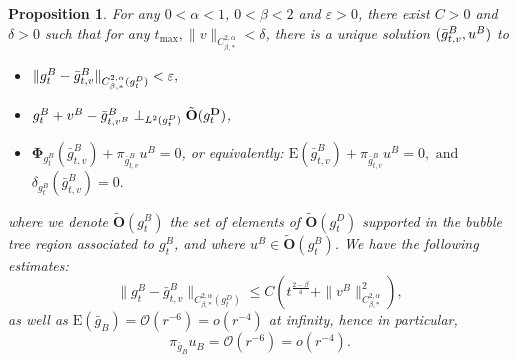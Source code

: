 \documentclass[11pt,reqno]{amsart}
\numberwithin{equation}{section}
\newcommand{\E}{\mathrm{E}}
\newcommand{\cO}{\mathcal{O}}
\newtheorem{proposition}[thm]{Proposition}
\theoremstyle{definition}
\theoremstyle{remark}
\begin{document}
\begin{proposition}\label{prop: gluing trees}
    For any $0<\alpha<1$, $0<\beta<2$ and $\varepsilon>0$, there exist $C>0$ and $\delta>0$ such that for any $t_{\max},\|v\|_{C^{2,\alpha}_{\beta,*}}<\delta$, there is a unique solution $(\Bar{g}^B_{t ,v },u^B )$ to 
\begin{itemize}
    \item $\|g^B_{t }-\Bar{g}^B_{t ,v }\|_{C^{2,\alpha}_{\beta,*}(g^D_{t })}<\varepsilon,$ 
    \item $g^B_{t }+v ^B-\Bar{g}^B_{t ,v ^B}\perp_{L^2(g^D_{t })} \tilde{\mathbf{O}}(g^\textbf{D}_{t })$,
    \item $\mathbf{\Phi}_{g^B_{t }}(\bar{g}^B_{t ,v }) + \pi_{\bar{g}^B_{t ,v }}u^B  = 0$, or equivalently: $\E(\bar{g}^B_{t ,v }) + \pi_{\bar{g}^B_{t ,v }}u^B  = 0,\text{ and}$
$\delta_{g^B_{t }}(\bar{g}^B_{t ,v }) = 0.$
\end{itemize}
where we denote $\tilde{\mathbf{O}}(g^B_{t })$ the set of elements of $\tilde{\mathbf{O}}(g^D_{t })$ supported in the bubble tree region associated to $g^B_{t }$, and where $u^B \in \tilde{\mathbf{O}}(g^B_{t })$. We have the following estimates: 
\begin{equation}\label{eq:control metric}
    \|g^B_{t }-\bar{g}^B_{t ,v }\|_{C^{2,\alpha}_{\beta,*}(g^D_{t })}\leqslant C (t^{\frac{2-\beta}4} + \|v ^B\|_{C^{2,\alpha}_{\beta,*}}^2),
\end{equation}
as well as $\E(\bar{g}_B)=\cO(r^{-6}) = o(r^{-4})$ at infinity,
hence in particular,
\begin{equation}\label{eq:decay pi uB}
    \pi_{\bar{g}_B}u_B =\cO(r^{-6})= o(r^{-4}).
\end{equation}
\end{proposition}
\end{document}
